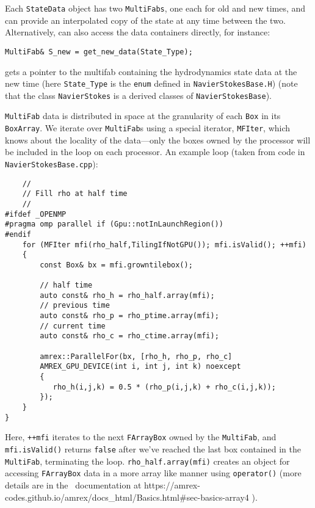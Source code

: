Each {\tt StateData} object has two {\tt MultiFabs}, one each for 
old and new times, and can provide an interpolated copy of the state at any time between the two.
Alternatively, can also access the data containers directly, for instance:
\begin{lstlisting}
MultiFab& S_new = get_new_data(State_Type);
\end{lstlisting}
gets a pointer to the multifab containing the hydrodynamics state data
at the new time (here {\tt State\_Type} is the {\tt enum} defined in 
{\tt NavierStokesBase.H}) (note that the class {\tt NavierStokes} 
is a derived classes of {\tt NavierStokesBase}).

{\tt MultiFab} data is distributed in space at the granularity of 
each {\tt Box} in its {\tt BoxArray}.  We iterate over {\tt MultiFab}s using a special
iterator, {\tt MFIter}, which knows about the locality of the data---only the boxes owned by the
processor will be included in the loop on each processor.  An example loop
(taken from code in {\tt NavierStokesBase.cpp}):
\begin{lstlisting}
    //
    // Fill rho at half time
    //
#ifdef _OPENMP
#pragma omp parallel if (Gpu::notInLaunchRegion())
#endif
    for (MFIter mfi(rho_half,TilingIfNotGPU()); mfi.isValid(); ++mfi)
    {
        const Box& bx = mfi.growntilebox();

        // half time
        auto const& rho_h = rho_half.array(mfi);
        // previous time
        auto const& rho_p = rho_ptime.array(mfi);
        // current time
        auto const& rho_c = rho_ctime.array(mfi);

        amrex::ParallelFor(bx, [rho_h, rho_p, rho_c] 
        AMREX_GPU_DEVICE(int i, int j, int k) noexcept
        {
           rho_h(i,j,k) = 0.5 * (rho_p(i,j,k) + rho_c(i,j,k));
        });
    }
}
\end{lstlisting} 
Here, {\tt ++mfi} iterates to the next {\tt FArrayBox} owned by the {\tt MultiFab}, 
and {\tt mfi.isValid()} returns {\tt false} after we've reached 
the last box contained in the {\tt MultiFab}, terminating the loop.
{\tt rho\_half.array(mfi)} creates an object for accessing {\tt FArrayBox} data in
a more array like manner using {\tt operator()}
(more details are in the \amrex\ documentation at
https://amrex-codes.github.io/amrex/docs\_html/Basics.html\#sec-basics-array4 ).


